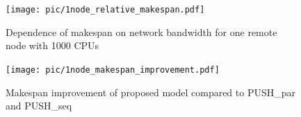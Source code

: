 \documentclass{svjour3}                     %
\begin{document}
\begin{figure}
\centering
\begin{minipage}{.9\textwidth}
\centering
    \texttt{[image: pic/1node\_relative\_makespan.pdf]}

    \caption{Dependence of makespan on network bandwidth for one remote node with 1000 CPUs}
    \label{1node_relative_makespan}
\end{minipage}\hspace{1pc}%
\begin{minipage}{.9\textwidth}
\centering
    \texttt{[image: pic/1node\_makespan\_improvement.pdf]}
    \caption{Makespan improvement of proposed model compared to PUSH\_par and PUSH\_seq}
    \label{1node_makespan_improvement}
\end{minipage} 
\end{figure}

\end{document}
